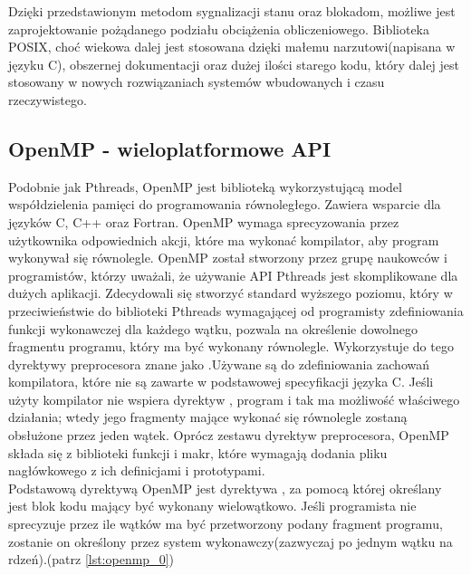 \documentclass[document.tex]{subfiles}
\begin{document}
\indent Dzięki przedstawionym metodom sygnalizacji stanu oraz 
blokadom, możliwe jest zaprojektowanie pożądanego podziału obciążenia
obliczeniowego. Biblioteka POSIX, choć wiekowa dalej jest stosowana
dzięki małemu narzutowi(napisana w języku C), obszernej dokumentacji 
oraz dużej ilości starego kodu, który dalej jest stosowany w nowych
rozwiązaniach systemów wbudowanych i czasu rzeczywistego.\cite{POSIX_tutorial}
\clearpage
\subsection{OpenMP - wieloplatformowe API}
\indent Podobnie jak Pthreads, OpenMP jest biblioteką wykorzystującą
model współdzielenia pamięci do programowania równoległego. Zawiera wsparcie dla języków C, C++ oraz Fortran.
OpenMP wymaga sprecyzowania przez użytkownika odpowiednich akcji, które ma wykonać kompilator, aby program wykonywał się równolegle.
\cite{openmp_pacheco}\cite{openmp_spec}
OpenMP został stworzony przez grupę naukowców i programistów, którzy
uważali, że używanie API Pthreads jest skomplikowane dla dużych
aplikacji. Zdecydowali się stworzyć standard wyższego poziomu, który
w przeciwieństwie do biblioteki Pthreads wymagającej od programisty zdefiniowania funkcji wykonawczej dla każdego wątku, pozwala 
na określenie dowolnego fragmentu programu, który ma być wykonany 
równolegle. Wykorzystuje do tego dyrektywy preprocesora znane jako
.Używane są do zdefiniowania zachowań kompilatora,
które nie są zawarte w podstawowej specyfikacji języka C.
Jeśli użyty kompilator nie wspiera dyrektyw , program
i tak ma możliwość właściwego działania; wtedy jego fragmenty mające wykonać
się równolegle zostaną obsłużone przez jeden wątek.
\cite{openmp_pacheco}\cite{C_King}\cite{openmp_spec}\cite{openmp_guide}
Oprócz zestawu dyrektyw preprocesora, OpenMP składa się z biblioteki
funkcji i makr, które wymagają dodania pliku nagłówkowego 
z ich definicjami i prototypami.
\\
\indent Podstawową dyrektywą OpenMP jest dyrektywa ,
za pomocą której określany jest blok kodu mający być wykonany wielowątkowo.
Jeśli programista nie sprecyzuje przez ile wątków
ma być przetworzony podany fragment programu, zostanie on określony przez system
wykonawczy(zazwyczaj po jednym wątku na rdzeń).\cite{openmp_pacheco}\cite{openmp_guide}(patrz \ref{lst:openmp_0})
\\

\end{document}
